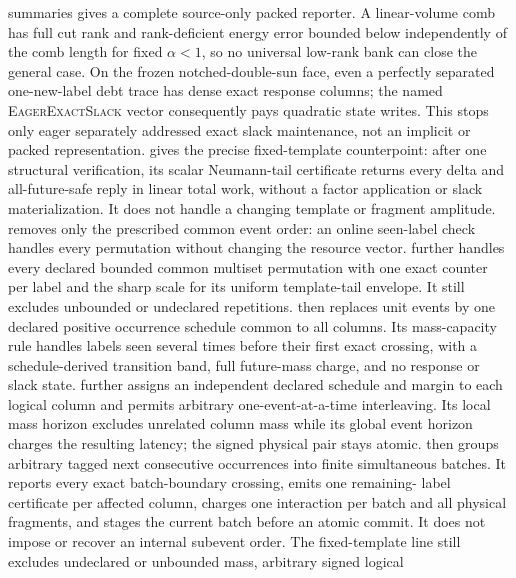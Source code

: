 summaries gives a complete source-only packed reporter.  A linear-volume comb
has full cut rank and rank-deficient energy error bounded below independently
of the comb length for fixed $\alpha<1$, so no universal low-rank bank can
close the general case.  On the frozen notched-double-sun face, even a
perfectly separated one-new-label debt trace has dense exact response columns;
the named \textsc{EagerExactSlack} vector consequently pays quadratic state
writes.  This stops only eager separately addressed exact slack maintenance,
not an implicit or packed representation.
 gives the precise fixed-template
counterpoint: after one structural verification, its scalar Neumann-tail
certificate returns every delta and all-future-safe reply in linear total
work, without a factor application or slack materialization.  It does not
handle a changing template or fragment amplitude.
 removes only the prescribed
common event order: an online seen-label check handles every permutation
without changing the resource vector.
 further handles every
declared bounded common multiset permutation with one exact counter per label
and the sharp scale for its uniform template-tail envelope.  It still excludes
unbounded or undeclared repetitions.
 then replaces unit events by
one declared positive occurrence schedule common to all columns.  Its
mass-capacity rule handles labels seen several times before their first exact
crossing, with a schedule-derived transition band, full future-mass charge,
and no response or slack state.
 further assigns an
independent declared schedule and margin to each logical column and permits
arbitrary one-event-at-a-time interleaving.  Its local mass horizon excludes
unrelated column mass while its global event horizon charges the resulting
latency; the signed physical pair stays atomic.
 then groups
arbitrary tagged next consecutive occurrences into finite simultaneous
batches.  It reports every exact batch-boundary crossing, emits one remaining-
label certificate per affected column, charges one interaction per batch and
all physical fragments, and stages the current batch before an atomic commit.
It does not impose or recover an internal subevent order.  The fixed-template
line still excludes undeclared or unbounded mass, arbitrary signed logical
